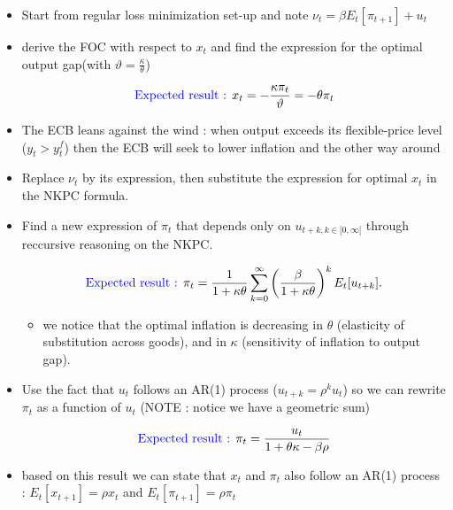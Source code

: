 \documentclass{article}
\begin{document}
\begin{itemize}
    \item Start from regular loss minimization set-up and note $\nu_t=\beta E_t[\pi_{t+1}]+u_t$
    \item derive the FOC with respect to $x_t$ and find the expression for the optimal output gap(with $\vartheta=\frac{\kappa}{\theta}$)
    \begin{expectedresultsbox}
    \begin{equation}
        \text{\textcolor{blue}{Expected result : }} x_t = -\frac{\kappa\pi_t}{\vartheta} = -\theta\pi_t
    \end{equation}
    \end{expectedresultsbox}
    \item The ECB leans against the wind : when output exceeds its flexible-price level ($y_t>y_t^f$) then the ECB will seek to lower inflation and the other way around
    \item Replace $\nu_t$ by its expression, then substitute the expression for optimal $x_t$ in the NKPC formula. 
    \item Find a new expression of $\pi_t$ that depends only on $u_{t+k,k\in[0,\infty[}$ through reccursive reasoning on the NKPC.
   \begin{expectedresultsbox}
       \begin{equation}
       \text{\textcolor{blue}{Expected result : }} \pi_t = \frac{1}{1+\kappa\theta}\sum_{k=0}^{\infty}\left( \frac{\beta}{1+\kappa\theta}\right) ^kE_t[u_{t+k}]. 
    \end{equation}
    \begin{itemize}
        \item we notice that the optimal inflation is decreasing in $\theta$ (elasticity of substitution across goods), and in $\kappa$ (sensitivity of inflation to output gap).
    \end{itemize}
   \end{expectedresultsbox}
    \item Use the fact that $u_t$ follows an AR(1) process ($u_{t+k}=\rho^ku_t$) so we can rewrite $\pi_t$ as a function of $u_t$ (NOTE : notice we have a geometric sum)
    \begin{expectedresultsbox}
    \begin{equation}
       \text{\textcolor{blue}{Expected result : }} \pi_t = \frac{u_t}{1+\theta\kappa-\beta\rho}
    \end{equation}  
    \end{expectedresultsbox}
    \item based on this result we can state that $x_t$ and $\pi_t$ also follow an AR(1) process : $E_t[x_{t+1}] = \rho x_t$ and $E_t[\pi_{t+1}] = \rho \pi_t$

\end{itemize}
\end{document}
